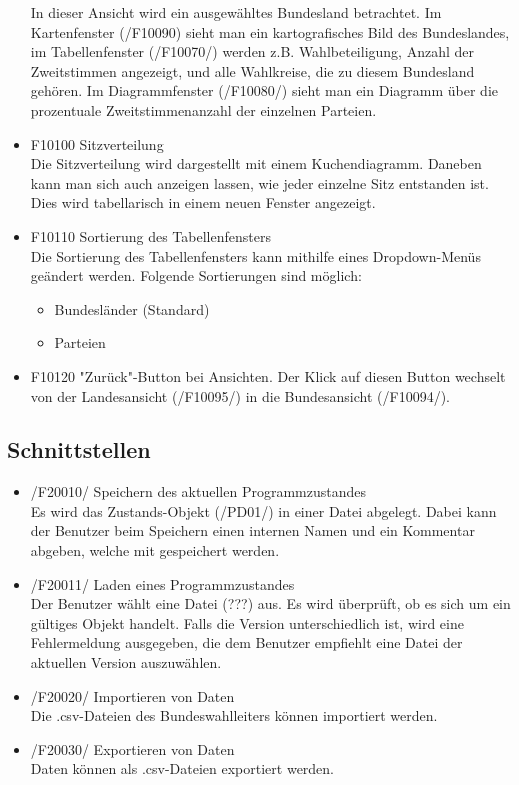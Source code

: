\documentclass[10pt,a4paper]{article}
\begin{document}
\begin{itemize}
	In dieser Ansicht wird ein ausgewähltes Bundesland betrachtet. Im Kartenfenster (/F10090) sieht man ein kartografisches Bild des Bundeslandes, im Tabellenfenster (/F10070/) werden z.B. Wahlbeteiligung, Anzahl der Zweitstimmen angezeigt, und alle Wahlkreise, die zu diesem Bundesland gehören. Im Diagrammfenster (/F10080/) sieht man ein Diagramm über die prozentuale Zweitstimmenanzahl der einzelnen Parteien.
	\item F10100 Sitzverteilung \hfill \\
	Die Sitzverteilung wird dargestellt mit einem Kuchendiagramm. Daneben kann man sich auch anzeigen lassen, wie jeder einzelne Sitz entstanden ist. Dies wird tabellarisch in einem neuen Fenster angezeigt.
	\item F10110 Sortierung des Tabellenfensters \hfill \\
	Die Sortierung des Tabellenfensters kann mithilfe eines Dropdown-Menüs geändert werden. Folgende Sortierungen sind möglich:
	\begin{itemize}
		\item Bundesländer (Standard)
		\item Parteien
	\end{itemize}
	\item F10120 "Zurück"-Button bei Ansichten.
	Der Klick auf diesen Button wechselt von der Landesansicht (/F10095/) in die Bundesansicht (/F10094/).
\end{itemize}

\subsection{Schnittstellen}
\begin{itemize}
	\item /F20010/ Speichern des aktuellen Programmzustandes \hfill \\
	Es wird das Zustands-Objekt (/PD01/) in einer Datei abgelegt. Dabei kann der Benutzer beim Speichern einen internen Namen und ein Kommentar abgeben, welche mit gespeichert werden.
	\item /F20011/ Laden eines Programmzustandes \hfill \\
	Der Benutzer wählt eine Datei (???) aus. Es wird überprüft, ob es sich um ein gültiges Objekt handelt. Falls die Version unterschiedlich ist, wird eine Fehlermeldung ausgegeben, die dem Benutzer empfiehlt eine Datei der aktuellen Version auszuwählen.
	\item /F20020/ Importieren von Daten \hfill \\
	Die .csv-Dateien des Bundeswahlleiters können importiert werden.
	\item /F20030/ Exportieren von Daten \hfill \\
	Daten können als .csv-Dateien exportiert werden.
	

\end{itemize}
\end{document}
